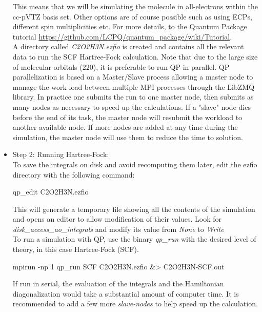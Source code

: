 \begin{itemize}
 
This means that we will be simulating the molecule in all-electrons within the cc-pVTZ basis set. Other options are of course possible such as using ECPs, different spin multiplicities etc. For more details, to the Quantum Package tutorial \url{https://github.com/LCPQ/quantum_package/wiki/Tutorial}.\\
A directory called \textit{C2O2H3N.ezfio} is created and contains all the relevant data to run the SCF Hartree-Fock calculation. Note that due to the large size of molecular orbitals (220), it is preferable to run QP in parallel. QP parallelization is based on a Master/Slave process allowing a master node to manage the work load between multiple MPI processes through the LibZMQ library. In practice one submits the run to one master node, then submits as many nodes as necessary to speed up the calculations. If a "slave" node dies before the end of its task, the master node will resubmit the workload to another available node. If more nodes are added at any time during the simulation, the master node will use them to reduce the time to solution.\\
\item Step 2: Running Hartree-Fock:\\
To save the integrals on disk and avoid recomputing them later, edit the ezfio directory with the following command:\\
\begin{shade}
qp_edit C2O2H3N.ezfio 
\end{shade}

This will generate a temporary file showing all the contents of the simulation and opens an editor to allow modification of their values. Look for \textit{disk\_access\_ao\_integrals} and modify its value from \textit{None} to \textit{Write}\\

To run a simulation with QP, use the binary \textit{qp\_run} with the desired level of theory, in this case Hartree-Fock (SCF). \\
\begin{shade}
mpirun -np 1 qp_run SCF C2O2H3N.ezfio &> C2O2H3N-SCF.out 
\end{shade}

If run in serial, the evaluation of the integrals and the Hamiltonian diagonalization would take a substantial amount of computer time. It is recommended to add a few more \textit{slave-nodes} to help speed up the calculation.\\


\end{itemize}

